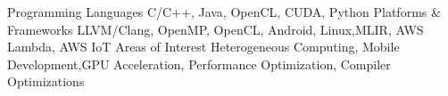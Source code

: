 \begin{cventries}
    \vspace{-1.3em}
    \cvskill
    {Programming Languages}
    {C/C++, Java, OpenCL, CUDA, Python}
    \cvskill
    {Platforms \& Frameworks}
    {LLVM/Clang, OpenMP, OpenCL, Android, Linux,\linebreak MLIR, AWS Lambda, AWS IoT}
    \cvskill
    {Areas of Interest}
    {Heterogeneous Computing, Mobile Development,\linebreak GPU Acceleration, Performance Optimization, \linebreak Compiler Optimizations}
\end{cventries}
